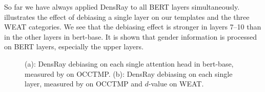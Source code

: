 So far we have always applied DensRay to all BERT layers
simultaneously.   illustrates the effect of
debiasing a single  layer on our templates and the three
WEAT categories. We see that the debiasing effect is
stronger in layers 7--10 than in the other layers in
bert-base. It is shown that gender information is processed on BERT layers, especially the upper layers.
\begin{figure}[h]
	\centering
	\centering
	\caption{(a): DensRay debiasing on each single attention head in bert-base, measured by  on OCCTMP. (b): DensRay debiasing on each single layer, measured by  on  OCCTMP and $d$-value on WEAT.}
\end{figure}

